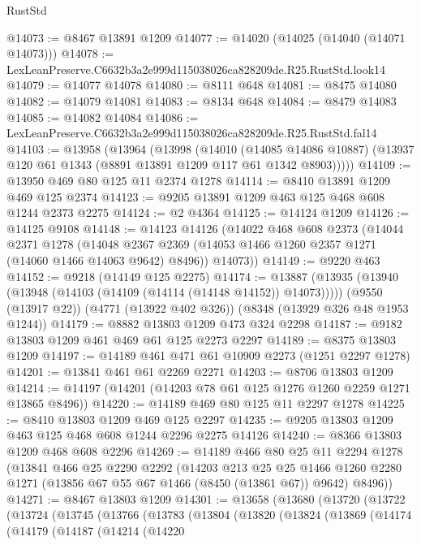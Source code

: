 \begin{lexlean}{RustStd}
\begin{coremodule}
@14073 := @8467 @13891 @1209
@14077 := @14020 (@14025 (@14040 (@14071 @14073)))
@14078 := LexLeanPreserve.C6632b3a2e999d115038026ca828209de.R25.RustStd.look14
@14079 := @14077 @14078
@14080 := @8111 @648
@14081 := @8475 @14080
@14082 := @14079 @14081
@14083 := @8134 @648
@14084 := @8479 @14083
@14085 := @14082 @14084
@14086 := LexLeanPreserve.C6632b3a2e999d115038026ca828209de.R25.RustStd.fal14
@14103 := @13958
    (@13964
      (@13998
        (@14010
          (@14085 @14086 @10887)
          (@13937 @120 @61 @1343 (@8891 @13891 @1209 @117 @61 @1342 @8903)))))
@14109 := @13950 @469 @80 @125 @11 @2374 @1278
@14114 := @8410 @13891 @1209 @469 @125 @2374
@14123 := @9205 @13891 @1209 @463 @125 @468 @608 @1244 @2373 @2275
@14124 := @2 @4364
@14125 := @14124 @1209
@14126 := @14125 @9108
@14148 := @14123
    @14126
    (@14022
      @468
      @608
      @2373
      (@14044
        @2371
        @1278
        (@14048 @2367 @2369 (@14053 @1466 @1260 @2357 @1271 (@14060 @1466 @14063 @9642) @8496))
        @14073))
@14149 := @9220 @463
@14152 := @9218 (@14149 @125 @2275)
@14174 := @13887
    (@13935 (@13940 (@13948 (@14103 (@14109 (@14114 (@14148 @14152)) @14073)))))
    (@9550 (@13917 @22))
    (@4771 (@13922 @402 @326))
    (@8348 (@13929 @326 @48 @1953 @1244))
@14179 := @8882 @13803 @1209 @473 @324 @2298
@14187 := @9182 @13803 @1209 @461 @469 @61 @125 @2273 @2297
@14189 := @8375 @13803 @1209
@14197 := @14189 @461 @471 @61 @10909 @2273 (@1251 @2297 @1278)
@14201 := @13841 @461 @61 @2269 @2271
@14203 := @8706 @13803 @1209
@14214 := @14197 (@14201 (@14203 @78 @61 @125 @1276 @1260 @2259 @1271 @13865 @8496))
@14220 := @14189 @469 @80 @125 @11 @2297 @1278
@14225 := @8410 @13803 @1209 @469 @125 @2297
@14235 := @9205 @13803 @1209 @463 @125 @468 @608 @1244 @2296 @2275 @14126
@14240 := @8366 @13803 @1209 @468 @608 @2296
@14269 := @14189
    @466
    @80
    @25
    @11
    @2294
    @1278
    (@13841
      @466
      @25
      @2290
      @2292
      (@14203
        @213
        @25
        @25
        @1466
        @1260
        @2280
        @1271
        (@13856 @67 @55 @67 @1466 (@8450 (@13861 @67)) @9642)
        @8496))
@14271 := @8467 @13803 @1209
@14301 := @13658
    (@13680
      (@13720
        (@13722
          (@13724
            (@13745
              (@13766
                (@13783
                  (@13804
                    (@13820
                      (@13824
                        (@13869
                          (@14174
                            (@14179
                              (@14187
                                (@14214
                                  (@14220

\end{coremodule}
\end{lexlean}
